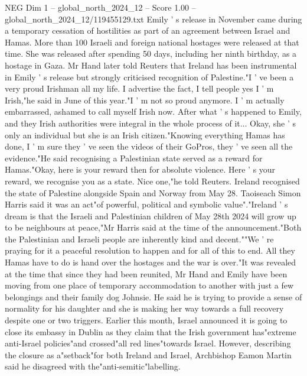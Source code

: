 \begin{textsample}{NEG Dim 1 – global\_north\_2024\_12 – Score 1.00 – global\_north\_2024\_12/119455129.txt}  \label{ex:f1_neg_194}
Emily ' s release in November came during a temporary cessation of hostilities as part of an agreement between Israel and Hamas.
More than 100 Israeli and foreign national hostages were released at that time.
She was released after spending 50 days, including her ninth birthday, as a hostage in Gaza.
Mr Hand later told Reuters that Ireland has been instrumental in Emily ' s release but strongly criticised recognition of Palestine."I ' ve been a very proud Irishman all my life.
I advertise the fact, I tell people yes I ' m Irish,"he said in June of this year."I ' m not so proud anymore.
I ' m actually embarrassed, ashamed to call myself Irish now.
After what ' s happened to Emily, and they Irish authorities were integral in the whole process of it...
Okay, she ' s only an individual but she is an Irish citizen."Knowing everything Hamas has done, I ' m sure they ' ve seen the videos of their GoPros, they ' ve seen all the evidence."He said recognising a Palestinian state served as a reward for Hamas."Okay, here is your reward then for absolute violence.
Here ' s your reward, we recognise you as a state.
Nice one,"he told Reuters.
Ireland recognised the state of Palestine alongside Spain and Norway from May 28.
Taoiseach Simon Harris said it was an act"of powerful, political and symbolic value"."Ireland ' s dream is that the Israeli and Palestinian children of May 28th 2024 will grow up to be neighbours at peace,"Mr Harris said at the time of the announcement."Both the Palestinian and Israeli people are inherently kind and decent.""We ' re praying for it a peaceful resolution to happen and for all of this to end.
All they Hamas have to do is hand over the hostages and the war is over."It was revealed at the time that since they had been reunited, Mr Hand and Emily have been moving from one place of temporary accommodation to another with just a few belongings and their family dog Johnsie.
He said he is trying to provide a sense of normality for his daughter and she is making her way towards a full recovery despite one or two triggers.
Earlier this month, Israel announced it is going to close its embassy in Dublin as they claim that the Irish government has"extreme anti-Israel policies"and crossed"all red lines"towards Israel.
However, describing the closure as a"setback"for both Ireland and Israel, Archbishop Eamon Martin said he disagreed with the"anti-semitic"labelling.

\end{textsample}
